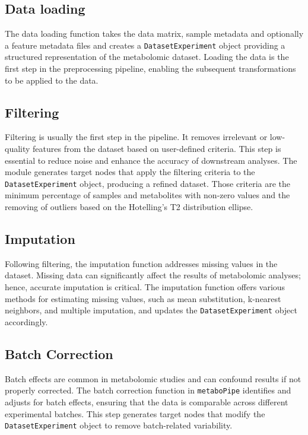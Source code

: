 \documentclass[ENG, BIB]{TFUOC}%
\begin{document}
\subsection{Data loading}
The data loading function takes the data matrix, sample metadata and optionally a feature metadata files and creates a \texttt{DatasetExperiment} object providing a structured representation of the metabolomic dataset. Loading the data is the first step in the preprocessing pipeline, enabling the subsequent transformations to be applied to the data.

\subsection{Filtering}
Filtering is usually the first step in the pipeline. It removes irrelevant or low-quality features from the dataset based on user-defined criteria. This step is essential to reduce noise and enhance the accuracy of downstream analyses.
The module generates target nodes that apply the filtering criteria to the
\texttt{DatasetExperiment} object, producing a refined dataset. Those criteria are the minimum percentage of samples and metabolites with non-zero values and the removing of outliers based on the Hotelling's T2 distribution ellipse.



\subsection{Imputation} 
Following filtering, the imputation function addresses missing values in the dataset. Missing data can significantly affect the results of metabolomic analyses; hence, accurate imputation is critical. The imputation function offers various methods for estimating missing values, such as mean substitution, k-nearest neighbors, and multiple imputation, and updates the \texttt{DatasetExperiment} object accordingly. 

\subsection{Batch Correction} 
Batch effects are common in metabolomic studies and can confound results if not properly corrected. The batch correction function in \texttt{metaboPipe} identifies and adjusts for batch effects, ensuring that the data is comparable across different experimental batches. This step generates target nodes that modify the \texttt{DatasetExperiment} object to remove batch-related variability. 
\end{document}
